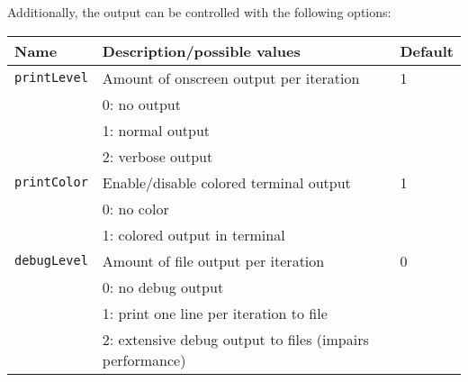 \documentclass[	11pt,
				a4paper,
				abstract=true,
				twoside=true,
				bibliography=totoc, 
				headinclude=true,
				footinclude=false]{scrartcl}
\begin{document}
Additionally, the output can be controlled with the following options:
\begin{longtable}[c]{lll}
Name 							& Description/possible values									& Default	\\\hline\hline
%
\texttt{printLevel}				& Amount of onscreen output per iteration						& 1			\\
								& 0: no output													&			\\
								& 1: normal output												&			\\
								& 2: verbose output												&			\\\hline
%								
\texttt{printColor}				& Enable/disable colored terminal output						& 1			\\
								& 0: no color													&			\\
								& 1: colored output in terminal									&			\\\hline
%
\texttt{debugLevel}				& Amount of file output per iteration							& 0			\\
								& 0: no debug output											& 			\\
								& 1: print one line per iteration to file 						& 			\\
								& 2: extensive debug output to files (impairs performance)		& 			\\\hline
\end{longtable}

\end{document}
